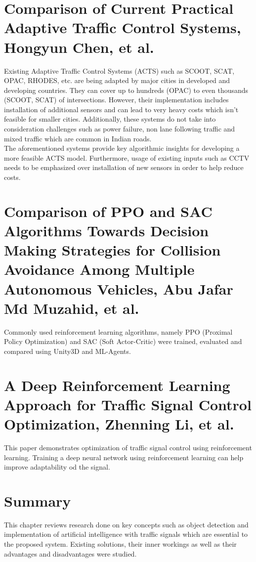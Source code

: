 \documentclass[openany,12pt]{report}
\begin{document}
	\section{Comparison of Current Practical Adaptive Traffic Control Systems, Hongyun Chen, et al. \cite{paper4}}
	\hspace*{0.5in}Existing Adaptive Traffic Control Systems (ACTS) such as SCOOT, SCAT, OPAC, RHODES, etc. are being adapted by major cities in developed and developing countries. They can cover up to hundreds (OPAC) to even thousands (SCOOT, SCAT) of intersections. However, their implementation includes installation of additional sensors and can lead to very heavy costs which isn't feasible for smaller cities. Additionally, these systems do not take into consideration challenges such as power failure, non lane following traffic and mixed traffic which are common in Indian roads.\\
	\hspace*{0.5in}The aforementioned systems provide key algorithmic insights for developing a more feasible ACTS model. Furthermore, usage of existing inputs such as CCTV needs to be emphasized over installation of new sensors in order to help reduce costs.\\
	
	\section{Comparison of PPO and SAC Algorithms Towards Decision Making Strategies for Collision Avoidance Among Multiple Autonomous Vehicles, Abu Jafar Md Muzahid, et al.\cite{paper7}}
	\hspace*{0.5 in}Commonly used reinforcement learning algorithms, namely  PPO (Proximal Policy Optimization) and SAC (Soft Actor-Critic) were trained, evaluated and compared using Unity3D and ML-Agents.
	
	\section{A Deep Reinforcement Learning Approach for Traffic Signal Control Optimization, Zhenning Li, et al. \cite{paper8}}
	\hspace*{0.5 in} This paper demonstrates optimization of traffic signal control using reinforcement learning. Training a deep neural network using reinforcement learning can help improve adaptability od the signal.
	
	\section{Summary}
	\hspace*{0.5in}This chapter reviews research done on key concepts such as object detection and implementation of artificial intelligence with traffic signals which are essential to the proposed system. Existing solutions, their inner workings as well as their advantages and disadvantages were studied.\\
	
\end{document}
